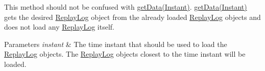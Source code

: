 This method should not be confused with \hyperlink{classedu_1_1kit_1_1trufflehog_1_1service_1_1replaylogging_1_1_replay_log_loader_a8d65e900a6e19990f4df0397e806fbc4}{get\+Data(\+Instant)}. \hyperlink{classedu_1_1kit_1_1trufflehog_1_1service_1_1replaylogging_1_1_replay_log_loader_a8d65e900a6e19990f4df0397e806fbc4}{get\+Data(\+Instant)} gets the desired \hyperlink{classedu_1_1kit_1_1trufflehog_1_1service_1_1replaylogging_1_1_replay_log}{Replay\+Log} object from the already loaded \hyperlink{classedu_1_1kit_1_1trufflehog_1_1service_1_1replaylogging_1_1_replay_log}{Replay\+Log} objects and does not load any \hyperlink{classedu_1_1kit_1_1trufflehog_1_1service_1_1replaylogging_1_1_replay_log}{Replay\+Log} itself. 


\begin{DoxyParams}{Parameters}
{\em instant} & The time instant that should be used to load the \hyperlink{classedu_1_1kit_1_1trufflehog_1_1service_1_1replaylogging_1_1_replay_log}{Replay\+Log} objects. The \hyperlink{classedu_1_1kit_1_1trufflehog_1_1service_1_1replaylogging_1_1_replay_log}{Replay\+Log} objects closest to the time instant will be loaded. \\
\hline
\end{DoxyParams}
